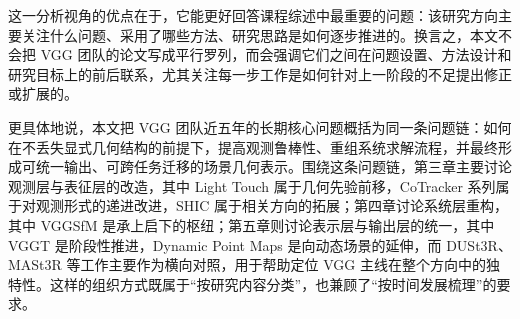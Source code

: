 这一分析视角的优点在于，它能更好回答课程综述中最重要的问题：该研究方向主要关注什么问题、采用了哪些方法、研究思路是如何逐步推进的。换言之，本文不会把 VGG 团队的论文写成平行罗列，而会强调它们之间在问题设置、方法设计和研究目标上的前后联系，尤其关注每一步工作是如何针对上一阶段的不足提出修正或扩展的。

更具体地说，本文把 VGG 团队近五年的长期核心问题概括为同一条问题链：如何在不丢失显式几何结构的前提下，提高观测鲁棒性、重组系统求解流程，并最终形成可统一输出、可跨任务迁移的场景几何表示。围绕这条问题链，第三章主要讨论观测层与表征层的改造，其中 Light Touch 属于几何先验前移，CoTracker 系列属于对观测形式的递进改进，SHIC 属于相关方向的拓展；第四章讨论系统层重构，其中 VGGSfM 是承上启下的枢纽；第五章则讨论表示层与输出层的统一，其中 VGGT 是阶段性推进，Dynamic Point Maps 是向动态场景的延伸，而 DUSt3R、MASt3R 等工作主要作为横向对照，用于帮助定位 VGG 主线在整个方向中的独特性。这样的组织方式既属于“按研究内容分类”，也兼顾了“按时间发展梳理”的要求。
